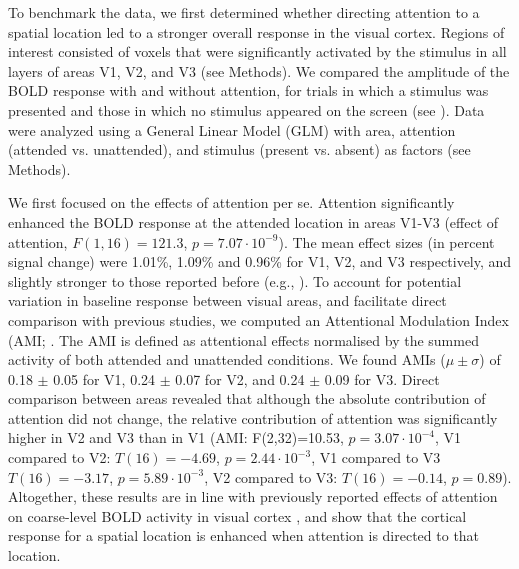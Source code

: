 \documentclass[9pt,lineno]{aperture}
\begin{document}
To benchmark the data, we first determined whether directing attention to a spatial location led to a stronger overall response in the visual cortex. Regions of interest consisted of voxels that were significantly activated by the stimulus in all layers of areas V1, V2, and V3 (see Methods). We compared the amplitude of the BOLD response with and without attention, for trials in which a stimulus was presented and those in which no stimulus appeared on the screen (see ). Data were analyzed using a General Linear Model (GLM) with area, attention (attended vs. unattended), and stimulus (present vs. absent) as factors (see Methods).

We first focused on the effects of attention per se. Attention significantly enhanced the BOLD response at the attended location in areas V1-V3 (effect of attention, $F(1,16)=121.3$, $p=7.07 \cdot 10^{-9}$). The mean effect sizes (in percent signal change) were 1.01\%, 1.09\% and 0.96\% for V1, V2, and V3 respectively, and slightly stronger to those reported before (e.g., \citet{Murray2008,Jehee2011,Sprague2013}). To account for potential variation in baseline response between visual areas, and facilitate direct comparison with previous studies, we computed an Attentional Modulation Index (AMI; \citep{Kastner1999}. The AMI is defined as attentional effects normalised by the summed activity of both attended and unattended conditions. We found AMIs ($\mu \pm \sigma$) of 0.18 $\pm$ 0.05 for V1, 0.24 $\pm$ 0.07 for V2, and 0.24 $\pm$ 0.09 for V3. Direct comparison between areas revealed that although the absolute contribution of attention did not change, the relative contribution of attention was significantly higher in V2 and V3 than in V1 (AMI: F(2,32)=10.53, $p=3.07 \cdot 10^{-4}$, V1 compared to V2: $T(16)=-4.69$, $p=2.44 \cdot 10^{-3}$, V1 compared to V3 $T(16)=-3.17$, $p=5.89 \cdot 10^{-3}$, V2 compared to V3: $T(16)=-0.14$, $p=0.89$). Altogether, these results are  in line with previously reported effects of attention on coarse-level BOLD activity in visual cortex \citep{Somers1999,Gandhi1999}, and show that the cortical response for a spatial location is enhanced when attention is directed to that location.
\end{document}
